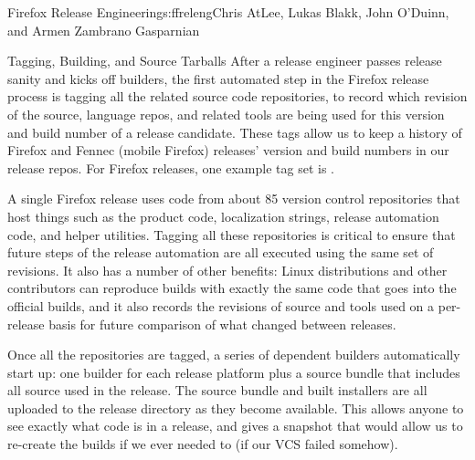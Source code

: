 \begin{aosachapter}{Firefox Release Engineering}{s:ffreleng}{Chris AtLee, Lukas Blakk, John O'Duinn, and Armen Zambrano Gasparnian}
\begin{aosasect1}{Tagging, Building, and Source Tarballs}
After a release engineer passes release sanity and kicks off builders,
the first automated step in the Firefox release process is tagging all
the related source code repositories, to record which revision of
the source, language repos, and related tools are being used for this
version and build number of a release candidate. 
These tags allow us
to keep a history of Firefox and Fennec (mobile Firefox) releases'
version and build numbers in our release repos.
For Firefox releases, one example tag set is
.  

A single Firefox
release uses code from about 85 version control repositories that host
things such as the product code, localization strings, release
automation code, and helper utilities. Tagging all these repositories
is critical to ensure that future steps of the release
automation are all executed using the same set of revisions. It also has a
number of other benefits: Linux distributions and other contributors
can reproduce builds with exactly the same code that goes into the
official builds, and it also records the revisions of source and tools
used on a per-release basis for future comparison of what changed
between releases. 
    
Once all the repositories are tagged, a series of dependent builders
automatically start up: one builder for each release platform plus a
source bundle that includes all source used in the release.  The source
bundle and built installers are all uploaded to the release directory
as they become available.  This allows anyone to see exactly what code
is in a release, and gives a snapshot that would allow us to re-create
the builds if we ever needed to (if our VCS failed somehow).
 

\end{aosasect1}
\end{aosachapter}
